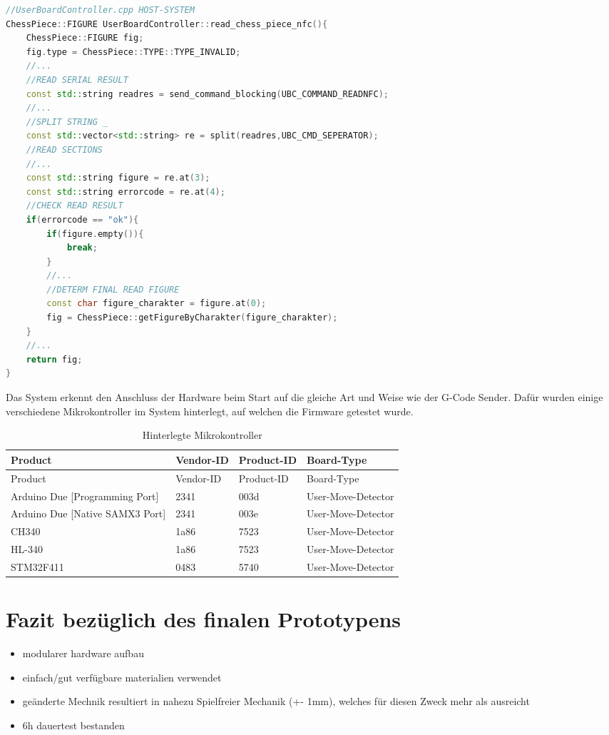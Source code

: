 \begin{lstlisting}[language={C++}]
//UserBoardController.cpp HOST-SYSTEM
ChessPiece::FIGURE UserBoardController::read_chess_piece_nfc(){
    ChessPiece::FIGURE fig;
    fig.type = ChessPiece::TYPE::TYPE_INVALID;
    //...
    //READ SERIAL RESULT
    const std::string readres = send_command_blocking(UBC_COMMAND_READNFC);
    //...
    //SPLIT STRING _
    const std::vector<std::string> re = split(readres,UBC_CMD_SEPERATOR);
    //READ SECTIONS
    //...
    const std::string figure = re.at(3);
    const std::string errorcode = re.at(4);
    //CHECK READ RESULT
    if(errorcode == "ok"){
        if(figure.empty()){
            break;
        }
        //...
        //DETERM FINAL READ FIGURE
        const char figure_charakter = figure.at(0);
        fig = ChessPiece::getFigureByCharakter(figure_charakter);
    }
    //...
    return fig;
}
\end{lstlisting}

Das System erkennt den Anschluss der Hardware beim Start auf die gleiche
Art und Weise wie der G-Code Sender. Dafür wurden einige verschiedene
Mikrokontroller im System hinterlegt, auf welchen die Firmware getestet
wurde.

\begin{longtable}[]{@{}llll@{}}
\caption{Hinterlegte Mikrokontroller}\tabularnewline
\toprule
Product & Vendor-ID & Product-ID & Board-Type\tabularnewline
\midrule
\endfirsthead
\toprule
Product & Vendor-ID & Product-ID & Board-Type\tabularnewline
\midrule
\endhead
Arduino Due {[}Programming Port{]} & 2341 & 003d &
User-Move-Detector\tabularnewline
Arduino Due {[}Native SAMX3 Port{]} & 2341 & 003e &
User-Move-Detector\tabularnewline
CH340 & 1a86 & 7523 & User-Move-Detector\tabularnewline
HL-340 & 1a86 & 7523 & User-Move-Detector\tabularnewline
STM32F411 & 0483 & 5740 & User-Move-Detector\tabularnewline
\bottomrule
\end{longtable}

\hypertarget{fazit-bezuxfcglich-des-finalen-prototypens}{%
\section{Fazit bezüglich des finalen
Prototypens}\label{fazit-bezuxfcglich-des-finalen-prototypens}}

\begin{itemize}
\tightlist
\item
  modularer hardware aufbau
\item
  einfach/gut verfügbare materialien verwendet
\item
  geänderte Mechnik resultiert in nahezu Spielfreier Mechanik (+- 1mm),
  welches für diesen Zweck mehr als ausreicht
\item
  6h dauertest bestanden
\end{itemize}

